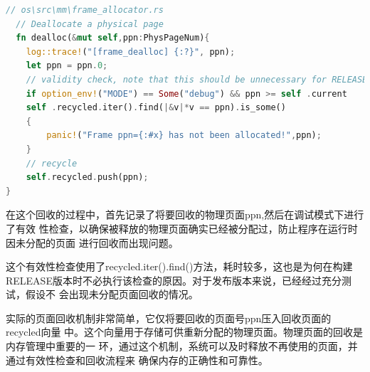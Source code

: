 \begin{lstlisting}[language=Rust]
  // os\src\mm\frame_allocator.rs
  // Deallocate a physical page
  fn dealloc(&mut self,ppn:PhysPageNum){
    log::trace!("[frame_dealloc] {:?}", ppn);
    let ppn = ppn.0;
    // validity check, note that this should be unnecessary for RELEASE build and it
    if option_env!("MODE") == Some("debug") && ppn >= self .current
    self .recycled.iter().find(|&v|*v == ppn).is_some()
    {
    	panic!("Frame ppn={:#x} has not been allocated!",ppn);
    }
    // recycle
    self.recycled.push(ppn);
}
\end{lstlisting}
  
  在这个回收的过程中，首先记录了将要回收的物理页面ppn,然后在调试模式下进行了有效
  性检查，以确保被释放的物理页面确实已经被分配过，防止程序在运行时因未分配的页面
  进行回收而出现问题。
  
  这个有效性检查使用了recycled.iter().find()方法，耗时较多，这也是为何在构建
  RELEASE版本时不必执行该检查的原因。对于发布版本来说，已经经过充分测试，假设不
  会出现未分配页面回收的情况。
  
  实际的页面回收机制非常简单，它仅将要回收的页面号ppn压入回收页面的recycled向量
  中。这个向量用于存储可供重新分配的物理页面。物理页面的回收是内存管理中重要的一
  环，通过这个机制，系统可以及时释放不再使用的页面，并通过有效性检查和回收流程来
  确保内存的正确性和可靠性。
%
